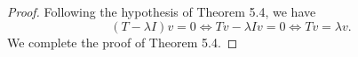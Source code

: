 \begin{Exercise}
	\begin{proof}
		Following the hypothesis of Theorem 5.4, we have
		$$
		(T-\lambda I) v = 0 \iff T v - \lambda I v = 0 \iff T v = \lambda v.
		$$
		We complete the proof of Theorem 5.4.
	\end{proof}
\end{Exercise}